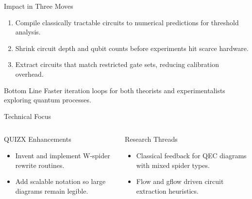 \documentclass[aspectratio=169]{beamer}
\begin{document}
\begin{frame}[t]{Impact in Three Moves}
  \begin{enumerate}[<+->]
    \item Compile classically tractable circuits to numerical predictions for threshold analysis.
    \item Shrink circuit depth and qubit counts before experiments hit scarce hardware.
    \item Extract circuits that match restricted gate sets, reducing calibration overhead.
  \end{enumerate}
  \vspace{0.3cm}
  \begin{exampleblock}{Bottom Line}
    Faster iteration loops for both theorists and experimentalists exploring quantum processes.
  \end{exampleblock}
\end{frame}

\begin{frame}[t]{Technical Focus}
  \begin{columns}[T,onlytextwidth]
      \begin{block}{QUIZX Enhancements}
        \begin{itemize}
          \item Invent and implement W-spider rewrite routines.
          \item Add scalable notation so large diagrams remain legible.
        \end{itemize}
      \end{block}
      \begin{exampleblock}{Research Threads}
        \begin{itemize}
          \item Classical feedback for QEC diagrams with mixed spider types.
          \item Flow and gflow driven circuit extraction heuristics.
        \end{itemize}
      \end{exampleblock}
  \end{columns}
\end{frame}
\end{document}
